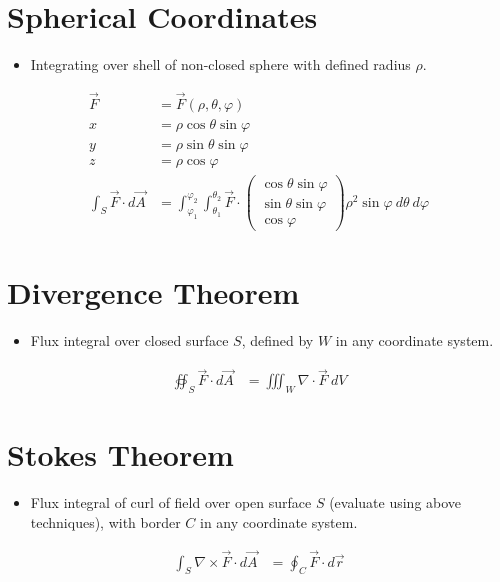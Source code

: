\documentclass[12pt]{extarticle}
\begin{document}
  \section{Spherical Coordinates}%
  \begin{itemize}
    \item Integrating over shell of non-closed sphere with defined radius $\rho$.
  \end{itemize}
  \begin{align*}
    \vec{F} &= \vec{F}(\rho,\theta,\varphi)\\
    x &= \rho\cos\theta\sin\varphi\\
    y &= \rho\sin\theta\sin\varphi\\
    z &= \rho\cos\varphi\\
    \int_{S} \vec{F} \cdot d\vec{A} &= \int_{\varphi_1}^{\varphi_2}\int_{\theta_1}^{\theta_2}\vec{F} \cdot \begin{pmatrix}\cos\theta\sin\varphi\\\sin\theta\sin\varphi\\\cos\varphi\end{pmatrix}\rho^2\sin\varphi~d\theta~d\varphi
  \end{align*}
  \section{Divergence Theorem}%
  \begin{itemize}
    \item Flux integral over closed surface $S$, defined by $W$ in any coordinate system.
  \end{itemize}
  \begin{align*}
    \oiint_{S}\vec{F}\cdot d\vec{A} &= \iiint_{W}\nabla\cdot \vec{F}~dV
  \end{align*}
  \section{Stokes Theorem}%
  \begin{itemize}
    \item Flux integral of curl of field over open surface $S$ (evaluate using above techniques), with border $C$ in any coordinate system.
  \end{itemize}
  \begin{align*}
    \int_{S}\nabla\times\vec{F} \cdot d\vec{A} &= \oint_{C}\vec{F}\cdot d\vec{r}
  \end{align*}
\end{document}
